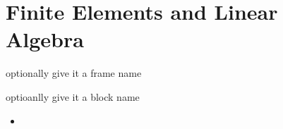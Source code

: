 \section{Finite Elements and Linear Algebra}
\begin{frame}{optionally give it a frame name}
	\begin{block}{optioanlly give it a block name}
		\begin{itemize}
			\item 
		\end{itemize}
	\end{block}
\end{frame}

